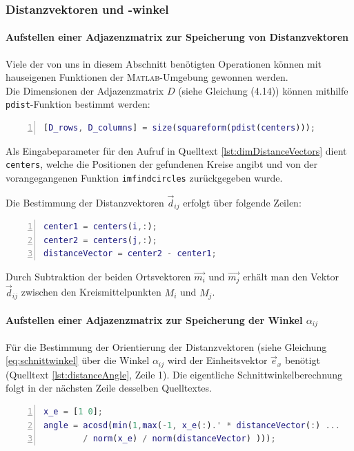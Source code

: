 \documentclass[accentcolor=tud1c, 11pt, toc=bib, toc=listof, captions=abovetable, parskip=half]{tudreport}
\begin{document}
\subsubsection{Distanzvektoren und -winkel}
\paragraph{Aufstellen einer Adjazenzmatrix zur Speicherung von Distanzvektoren}

Viele der von uns in diesem Abschnitt benötigten Operationen können mit hauseigenen Funktionen der \textsc{Matlab}-Umgebung gewonnen werden.\\

Die Dimensionen der Adjazenzmatrix $D$ (siehe Gleichung (4.14)) können mithilfe \lstinline|pdist|-Funktion bestimmt werden:
\begin{lstlisting}[frame=single, language=MATLAB, numbers=left, basicstyle=\ttfamily, caption=Dimensionsbestimmung der Abstandsvektorenmatrix $D$, label=lst:dimDistanceVectors]
[D_rows, D_columns] = size(squareform(pdist(centers)));
\end{lstlisting}

Als Eingabeparameter für den Aufruf in Quelltext \ref{lst:dimDistanceVectors} dient \lstinline|centers|, welche die Positionen der gefundenen Kreise angibt und von der vorangegangenen Funktion \lstinline|imfindcircles| zurückgegeben wurde.

Die Bestimmung der Distanzvektoren $\vec{d}_{ij}$ erfolgt über folgende Zeilen:
\begin{lstlisting}[frame=single, language=MATLAB, numbers=left, basicstyle=\ttfamily, caption=Bestimmung der Distanzvektoren $\vec{d}_{ij}$, label=lst:distanceVectors]
center1 = centers(i,:);
center2 = centers(j,:);
distanceVector = center2 - center1;
\end{lstlisting}

Durch Subtraktion der beiden Ortsvektoren $\vec{m_i}$ und $\vec{m_j}$ erhält man den Vektor $\vec{d}_{ij}$ zwischen den Kreismittelpunkten $M_i$ und $M_j$.

\paragraph{Aufstellen einer Adjazenzmatrix zur Speicherung der Winkel $\alpha_{ij}$}
Für die Bestimmung der Orientierung der Distanzvektoren (siehe Gleichung \ref{eq:schnittwinkel} über die Winkel $\alpha_{ij}$ wird der Einheitsvektor $\vec{e}_x$ benötigt (Quelltext \ref{lst:distanceAngle}, Zeile 1). Die eigentliche Schnittwinkelberechnung folgt in der nächsten Zeile desselben Quelltextes.
\begin{lstlisting}[frame=single, language=MATLAB, numbers=left, basicstyle=\ttfamily, caption=Bestimmung des Schnittwinkels $\alpha_{ij}$ zwischen $\vec{d}_{ij}$ und $\vec{e}_x$, label=lst:distanceAngle]
x_e = [1 0];
angle = acosd(min(1,max(-1, x_e(:).' * distanceVector(:) ...
		/ norm(x_e) / norm(distanceVector) )));
\end{lstlisting}
\end{document}
